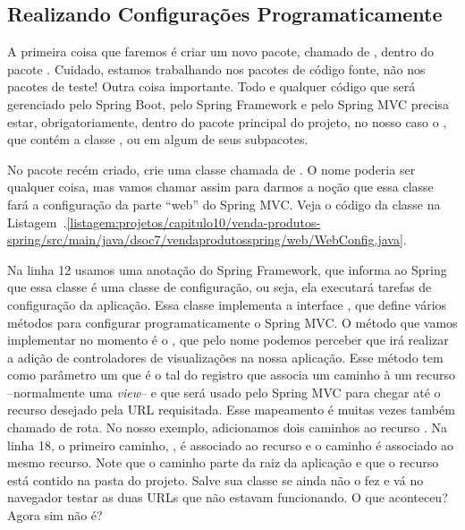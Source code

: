 \subsection{Realizando Configurações Programaticamente}

A primeira coisa que faremos é criar um novo pacote, chamado de , dentro do pacote . Cuidado, estamos trabalhando nos pacotes de código fonte, não nos pacotes de teste! Outra coisa importante. Todo e qualquer código que será gerenciado pelo Spring Boot, pelo Spring Framework e pelo Spring MVC precisa estar, obrigatoriamente, dentro do pacote principal do projeto, no nosso caso o , que contém a classe , ou em algum de seus subpacotes.

No pacote  recém criado, crie uma classe chamada de . O nome poderia ser qualquer coisa, mas vamos chamar assim para darmos a noção que essa classe fará a configuração da parte ``web'' do Spring MVC. Veja o código da classe na Listagem~\thechapter.\ref{listagem:projetos/capitulo10/venda-produtos-spring/src/main/java/dsoc7/vendaprodutosspring/web/WebConfig.java}.


Na linha 12 usamos uma anotação  do Spring Framework, que informa ao Spring que essa classe é uma classe de configuração, ou seja, ela executará tarefas de configuração da aplicação. Essa classe implementa a interface , que define vários métodos para configurar programaticamente o Spring MVC. O método que vamos implementar no momento é o , que pelo nome podemos perceber que irá realizar a adição de controladores de visualizações na nossa aplicação. Esse método tem como parâmetro um  que é o tal do registro que associa um caminho à um recurso --normalmente uma \textit{view}-- e que será usado pelo Spring MVC para chegar até o recurso desejado pela URL requisitada. Esse mapeamento é muitas vezes também chamado de rota. No nosso exemplo, adicionamos dois caminhos ao recurso . Na linha 18, o primeiro caminho, , é associado ao recurso  e o caminho  é associado ao mesmo recurso. Note que o caminho parte da raiz da aplicação e que o recurso está contido na pasta  do projeto. Salve sua classe se ainda não o fez e vá no navegador testar as duas URLs que não estavam funcionando. O que aconteceu? Agora sim não é?



